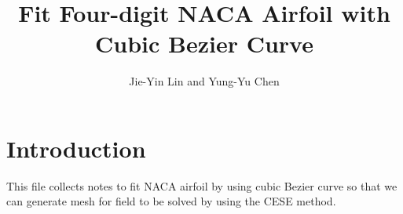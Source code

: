 \documentclass{turgon}
\title{Fit Four-digit NACA Airfoil with Cubic Bezier Curve}
\author{Jie-Yin Lin and Yung-Yu Chen}
\begin{document}
\maketitle
\tableofcontents


\chapter*{Introduction}

This file collects notes to fit NACA airfoil by using cubic Bezier curve so that we can generate mesh for field to be
solved by using the CESE method\cite{chang_method_1995}.








\clearpage
{}


\end{document}
